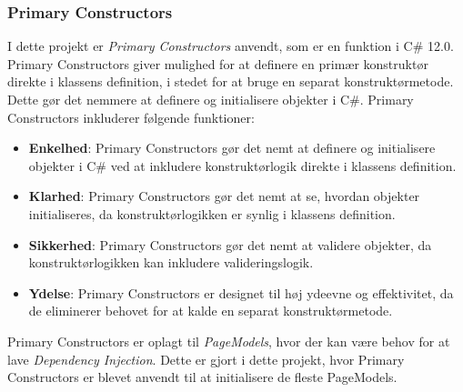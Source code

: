 \subsubsection{Primary Constructors}
I dette projekt er \emph{Primary Constructors} anvendt, som er en funktion i C\# 12.0. Primary Constructors giver mulighed for at definere en primær konstruktør direkte i klassens definition, i stedet for at bruge en separat konstruktørmetode. Dette gør det nemmere at definere og initialisere objekter i C\#. Primary Constructors inkluderer følgende funktioner:
\begin{itemize}
\item \textbf{Enkelhed}: Primary Constructors gør det nemt at definere og initialisere objekter i C\# ved at inkludere konstruktørlogik direkte i klassens definition.
\item \textbf{Klarhed}: Primary Constructors gør det nemt at se, hvordan objekter initialiseres, da konstruktørlogikken er synlig i klassens definition.
\item \textbf{Sikkerhed}: Primary Constructors gør det nemt at validere objekter, da konstruktørlogikken kan inkludere valideringslogik.
\item \textbf{Ydelse}: Primary Constructors er designet til høj ydeevne og effektivitet, da de eliminerer behovet for at kalde en separat konstruktørmetode.
\end{itemize}
Primary Constructors er oplagt til \emph{PageModels}, hvor der kan være behov for at lave \emph{Dependency Injection}. Dette er gjort i dette projekt, hvor Primary Constructors er blevet anvendt til at initialisere de fleste PageModels.

